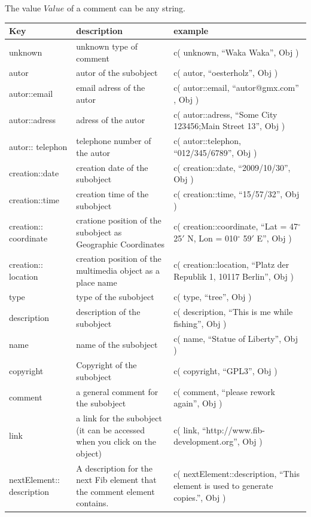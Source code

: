 The value $Value$ of a comment can be any string.

\begin{center}
\begin{longtable}{|p{20mm}|p{55mm}|p{50mm}|}\hline
	Key & description & example \\\hline\hline
	unknown & unknown type of comment & c( unknown, ``Waka Waka'', Obj )\\\hline
	autor & autor of the subobject & c( autor, ``oesterholz'', Obj )\\\hline
	autor::email & email adress of the autor & c( autor::email, ``autor@gmx.com'' , Obj )\\\hline
	autor::adress & adress of the autor & c( autor::adress, ``Some City 123456;Main Street 13'', Obj )\\\hline
	autor:: telephon & telephone number of the autor & c( autor::telephon, ``012/345/6789'', Obj )\\\hline
	creation::date & creation date of the subobject & c( creation::date, ``2009/10/30'', Obj )\\\hline
	creation::time & creation time of the subobject & c( creation::time, ``15/57/32'', Obj )\\\hline
	creation:: coordinate & cratione position of the subobject as Geographic Coordinates & c( creation::coordinate, ``Lat = 47$^\circ$ 25$'$ N, Lon = 010$^\circ$ 59$'$ E'', Obj )\\\hline
	creation:: location & creation position of the multimedia object as a place name & c( creation::location, ``Platz der Republik 1, 10117 Berlin'', Obj )\\\hline
	type & type of the subobject & c( type, ``tree'', Obj )\\\hline
	description & description of the subobject & c( description, ``This is me while fishing'', Obj )\\\hline
	name & name of the subobject & c( name, ``Statue of Liberty'', Obj )\\\hline
	copyright & Copyright of the subobject & c( copyright, ``GPL3'', Obj )\\\hline
	comment & a general comment for the subobject & c( comment, ``please rework again'', Obj )\\\hline
	link & a link for the subobject (it can be accessed when you click on the object) & c( link, ``http://www.fib-development.org'', Obj )\\\hline
	nextElement:: description & A description for the next Fib element that the comment element contains. & c( nextElement::description, ``This element is used to generate copies.'', Obj )\\\hline

\end{longtable}
\end{center}
